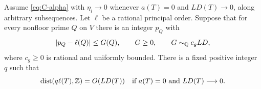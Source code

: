 \begin{lemma}\label{lem:C-scaled-phase}
Assume \eqref{eq:C-alpha} with $\eta_i\to0$ whenever
$a(T)=0$ and $LD(T)\to0$, along arbitrary subsequences.  Let $\ell$
be a rational principal order.  Suppose that for every nonfloor prime
$Q$ on $V$ there is an integer $p_Q$ with
\begin{equation}\label{eq:C-nonfloor-phase}
 |p_Q-\ell(Q)|\leq G(Q),\qquad
 G\geq0,\qquad G\sim_\mathbb Q c_gLD,
\end{equation}
where $c_g\geq0$ is rational and uniformly bounded.  There is a fixed
positive integer $q$ such that
\begin{equation}\label{eq:C-scaled-phase}
 \operatorname{dist}(q\ell(T),\mathbb Z)=O(LD(T))
 \quad\text{if }a(T)=0\text{ and }LD(T)\longrightarrow0.
\end{equation}
\end{lemma}

